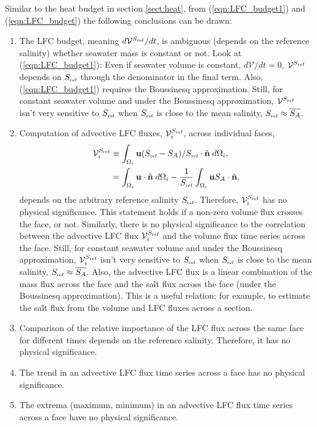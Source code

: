 \documentclass[10pt]{amsart}
\newcommand{\surf}{\Omega}
\newcommand{\Sref}{S_{\mbox{\tiny ref}}}
\newcommand{\V}{{\mathcal V}}
\newcommand{\LFC}{\V^{\Sref}}
\begin{document}
Similar to the heat budget in section \ref{sect:heat}, from (\ref{eqn:LFC_budget1}) and (\ref{eqn:LFC_budget}) the following conclusions can be drawn:
\begin{enumerate}
\item The LFC budget, meaning $d \LFC / dt$, is ambiguous (depends on the reference salinity) whether seawater mass is constant or not. 
Look at (\ref{eqn:LFC_budget1}): Even if seawater volume is constant, $d \V / dt = 0$, $\LFC$ depends on $\Sref$ through the denominator in the final term. Also, (\ref{eqn:LFC_budget1}) requires the Boussinesq approximation.
Still, for constant seawater volume and under the Boussinesq approximation, $\LFC$ isn't very sensitive to $\Sref$ when $\Sref$ is close to the mean salinity, $\Sref \approx \overline{S_A}$.
\item Computation of advective LFC fluxes, $\LFC_i$, across individual faces, 
\begin{align}
\LFC_i & \equiv \int_{\surf_i} {\bf u} (\Sref  - S_A)/\Sref  \cdot {\hat{\bf n}}  \; d \surf_i  , \nonumber \\
& =  \int_{\surf_i} {\bf u}  \cdot {\hat{\bf n}}  \; d \surf_i  - \frac{1}{ \Sref} \int_{\surf_i} {\bf u} S_A  \cdot {\hat{\bf n}} , \nonumber
\end{align}
depends on the arbitrary reference salinity $\Sref$.
Therefore, $\LFC_i$ has no physical significance.
This statement holds if a non-zero volume flux crosses the face, or not.
Similarly, there is no physical significance to the correlation between the advective LFC flux $\LFC_i$ and the volume flux time series across the face. 
Still, for constant seawater volume and under the Boussinesq approximation, $\LFC_i$ isn't very sensitive to $\Sref$ when $\Sref$ is close to the mean salinity, $\Sref \approx \overline{S_A}$.
Also, the advective LFC flux is a linear combination of the mass flux across the face and the salt flux across the face (under the Boussinesq approximation).
This is a useful relation; for example, to estimate the salt flux from the volume and LFC fluxes across a section.
\item Comparison of the relative importance of the LFC flux across the same face for different times depends on the reference salinity. Therefore, it has no physical significance. 
\item The trend in an advective LFC flux time series across a face has no physical significance. 
\item The extrema (maximum, minimum) in an advective LFC flux time series across a face have no physical significance.

\end{enumerate}
\end{document}
